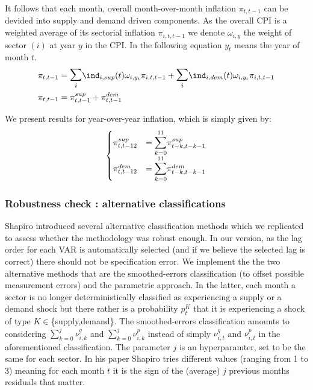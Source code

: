 It follows that each month, overall month-over-month inflation $\pi_{t,t-1}$ can be devided into supply and demand driven components. 
As the overall CPI is a weighted average of its sectorial inflation $\pi_{i,t,t-1}$ we denote $\omega_{i,y}$ the weight of sector $(i)$ at year $y$ in the CPI.
In the following equation $y_t$ means the year of month $t$.
\begin{align*}
    \pi_{t,t-1} &= \mathlarger{\mathlarger{\sum}}_{i} \ind_{i,sup}(t) \omega_{i,y_t} \pi_{i,t,t-1} + \mathlarger{\mathlarger{\sum}}_{i} \ind_{i,dem}(t) \omega_{i,y_t} \pi_{i,t,t-1} \\
    \pi_{t,t-1} &= \pi_{t,t-1}^{sup} + \pi_{t,t-1}^{dem}
\end{align*}

We present results for year-over-year inflation, which is simply given by:
\begin{align*}
    \begin{cases}
        \pi_{t,t-12}^{sup} &= \mathlarger{\mathlarger{\sum}}_{k=0}^{11} \pi_{t-k,t-k-1}^{sup} \\
        \pi_{t,t-12}^{dem} &= \mathlarger{\mathlarger{\sum}}_{k=0}^{11} \pi_{t-k,t-k-1}^{dem}
    \end{cases}
\end{align*}

\subsubsection{Robustness check : alternative classifications}

\quad Shapiro introduced several alternative classification methods which we replicated to assess whether the methodology was robust enough.
In our version, as the lag order for each VAR is automatically selected (and if we believe the selected lag is correct) there should not be specification error.
\bigbreak
We implement the the two alternative methods that are the smoothed-errors classification (to offset possible measurement errors) and the parametric approach. 
In the latter, each month a sector is no longer deterministically classified as experiencing a supply or a demand shock but there rather is a probability $p_t^K$ that it is experiencing a shock of type $K \in$\{supply,demand\}.
\bigbreak
The smoothed-errors classification amounts to considering $\sum_{k=0}^{j} \nu_{i,k}^{q}$ and $\sum_{k=0}^{j} \nu_{i,k}^{p}$ instead of simply $\nu_{i,t}^{q}$ and $\nu_{i,t}^{p}$ in the aforementioned classification. 
The parameter $j$ is an hyperparamter, set to be the same for each sector. In his paper Shapiro tries different values (ranging from 1 to 3) meaning for each month $t$ it is the sign of the (average) $j$ previous months residuals that matter.


